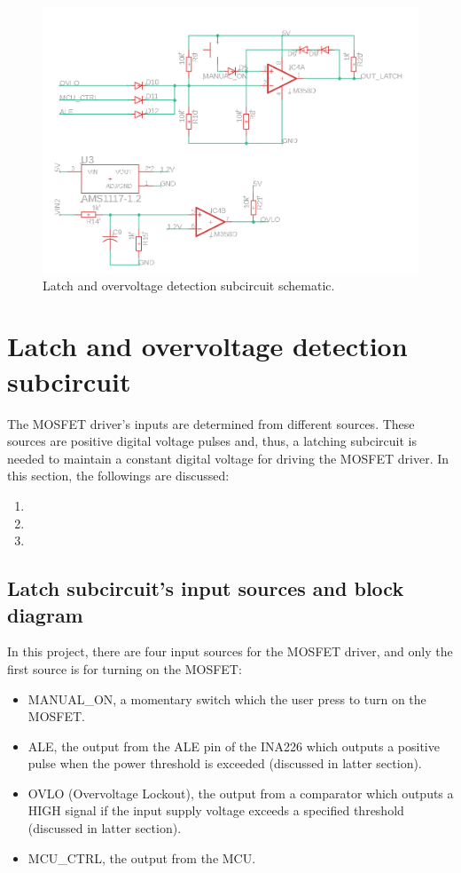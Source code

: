 \documentclass[../main.tex]{subfiles}
\begin{document}
    \begin{figure}[!h]
        \centerline{\includegraphics[width=\linewidth]{media/latch_circuit_schematic.png}}
        \caption{Latch and overvoltage detection subcircuit schematic.}
        \label{fig:latch_circuit_schematic}
    \end{figure}
    \section{Latch and overvoltage detection subcircuit}
    The MOSFET driver's inputs are determined from different sources. These sources are positive digital voltage pulses and, thus, a latching subcircuit is needed to maintain a constant digital voltage for driving the MOSFET driver. In this section, the followings are discussed:
    \begin{enumerate}
        \item {}
        \item {}
        \item {}
    \end{enumerate}

    \pagebreak
    \subsection{Latch subcircuit's input sources and block diagram} \label{ssec:latch_input_src}
    In this project, there are four input sources for the MOSFET driver, and only the first source is for turning on the MOSFET:
    \begin{itemize}
        \item MANUAL\_ON, a momentary switch which the user press to turn on the MOSFET.
        \item ALE, the output from the ALE pin of the INA226 which outputs a positive pulse when the power threshold is exceeded (discussed in latter section).
        \item OVLO (Overvoltage Lockout), the output from a comparator which outputs a HIGH signal if the input supply voltage exceeds a specified threshold (discussed in latter section).
        \item MCU\_CTRL, the output from the MCU.
    \end{itemize}
\end{document}

